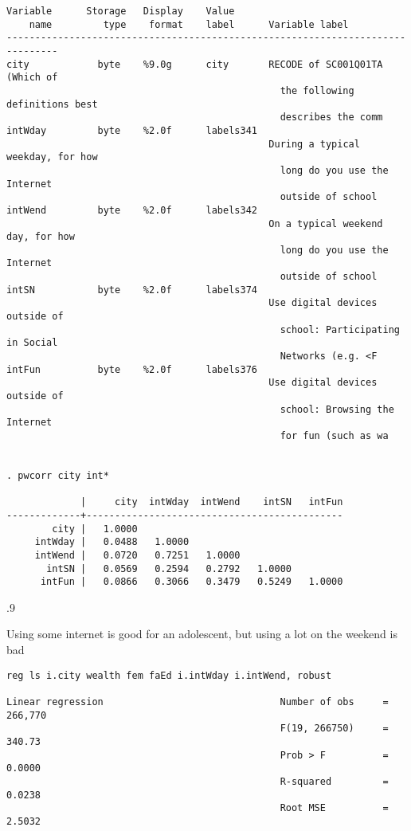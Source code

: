 \documentclass[11pt, letterpaper]{article}
\begin{document}
\begin{spacing}{1.9}
\begin{spacing}{.5}
\begin{scriptsize}
\begin{verbatim}
Variable      Storage   Display    Value
    name         type    format    label      Variable label
-------------------------------------------------------------------------------
city            byte    %9.0g      city       RECODE of SC001Q01TA (Which of
                                                the following definitions best
                                                describes the comm
intWday         byte    %2.0f      labels341
                                              During a typical weekday, for how
                                                long do you use the Internet
                                                outside of school
intWend         byte    %2.0f      labels342
                                              On a typical weekend day, for how
                                                long do you use the Internet
                                                outside of school
intSN           byte    %2.0f      labels374
                                              Use digital devices outside of
                                                school: Participating in Social
                                                Networks (e.g. <F
intFun          byte    %2.0f      labels376
                                              Use digital devices outside of
                                                school: Browsing the Internet
                                                for fun (such as wa


. pwcorr city int*

             |     city  intWday  intWend    intSN   intFun
-------------+---------------------------------------------
        city |   1.0000 
     intWday |   0.0488   1.0000 
     intWend |   0.0720   0.7251   1.0000 
       intSN |   0.0569   0.2594   0.2792   1.0000 
      intFun |   0.0866   0.3066   0.3479   0.5249   1.0000 
\end{verbatim}
\end{scriptsize}
\end{spacing}{.9}

Using some internet is good for an adolescent, but using a lot on the weekend is bad


\begin{spacing}{.5}
\begin{scriptsize}
\begin{verbatim}
reg ls i.city wealth fem faEd i.intWday i.intWend, robust

Linear regression                               Number of obs     =    266,770
                                                F(19, 266750)     =     340.73
                                                Prob > F          =     0.0000
                                                R-squared         =     0.0238
                                                Root MSE          =     2.5032


\end{verbatim}
\end{scriptsize}
\end{spacing}
\end{spacing}
\end{document}

